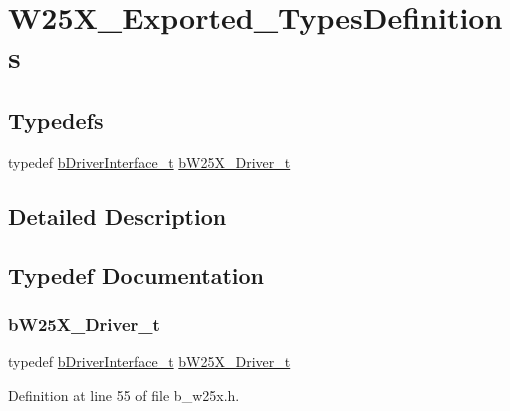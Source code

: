 \hypertarget{group___w25_x___exported___types_definitions}{}\section{W25\+X\+\_\+\+Exported\+\_\+\+Types\+Definitions}
\label{group___w25_x___exported___types_definitions}
\subsection*{Typedefs}
\begin{DoxyCompactItemize}
\item 
typedef \mbox{\hyperlink{structb_driver_interface__t}{b\+Driver\+Interface\+\_\+t}} \mbox{\hyperlink{group___w25_x___exported___types_definitions_gadda45650bf6c5ce0216af3f25bb453dc}{b\+W25\+X\+\_\+\+Driver\+\_\+t}}
\end{DoxyCompactItemize}


\subsection{Detailed Description}


\subsection{Typedef Documentation}
\mbox{\label{group___w25_x___exported___types_definitions_gadda45650bf6c5ce0216af3f25bb453dc}} 
\subsubsection{\texorpdfstring{b\+W25\+X\+\_\+\+Driver\+\_\+t}{bW25X\_Driver\_t}}
{\footnotesize\ttfamily typedef \mbox{\hyperlink{structb_driver_interface__t}{b\+Driver\+Interface\+\_\+t}} \mbox{\hyperlink{group___w25_x___exported___types_definitions_gadda45650bf6c5ce0216af3f25bb453dc}{b\+W25\+X\+\_\+\+Driver\+\_\+t}}}



Definition at line 55 of file b\+\_\+w25x.\+h.

